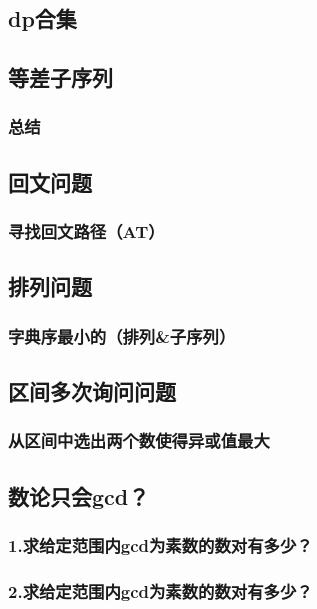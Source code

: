 \documentclass[10pt,a4paper]{article}
\begin{document}
\subsection{dp合集}

\subsection{等差子序列}
\subsubsection{总结}

\subsection{回文问题}
\subsubsection{寻找回文路径（AT）}

\subsection{排列问题}
\subsubsection{字典序最小的（排列&子序列）}

\subsection{区间多次询问问题}
\subsubsection{从区间中选出两个数使得异或值最大}

\subsection{数论只会gcd？}
\subsubsection{1.求给定范围内gcd为素数的数对有多少？}

\subsubsection{2.求给定范围内gcd为素数的数对有多少？}

\end{document}
